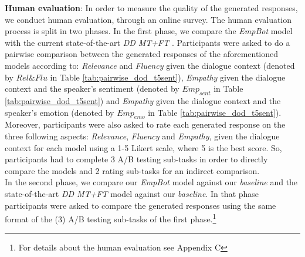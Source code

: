 \documentclass[11pt]{article}
\begin{document}
\noindent \textbf{Human evaluation}:
In order to measure the quality  of  the  generated  responses,  we  conduct human evaluation, through an online survey. The human evaluation process is split in two phases. In the first phase, we compare the \textit{EmpBot} model with the current state-of-the-art \textit{DD MT+FT} \citep{shuster_2019_dodeca_dialogues}. Participants were asked to do a pairwise comparison between the generated responses of the aforementioned models according to:
     \textit{Relevance} and \textit{Fluency}  given the dialogue context (denoted by $Rel\&Flu$ in Table \ref{tab:pairwise_dod_t5sent}),
     \textit{Empathy}  given the dialogue context and the speaker's sentiment (denoted by $Emp_{sent}$ in Table \ref{tab:pairwise_dod_t5sent}) and
     \textit{Empathy}  given the dialogue context and the speaker's emotion (denoted by $Emp_{emo}$ in Table \ref{tab:pairwise_dod_t5sent}).
Moreover, participants were also asked to rate each generated response  on the three following aspects: \textit{Relevance}, \textit{Fluency} and \textit{Empathy}, given the dialogue context for each model using a 1-5 Likert scale, where 5 is the best score. So, participants had to complete 3 A/B testing sub-tasks in order to directly compare the models and 2 rating sub-tasks for an indirect comparison. 
\\In the second phase, we compare our \textit{EmpBot} model against our \textit{baseline} and the state-of-the-art \textit{DD MT+FT} model against our \textit{baseline}. In that phase participants were asked to compare the generated responses using the same format of the (3) A/B testing sub-tasks of the first phase.\footnote{For details about the human evaluation  see Appendix C} 
\end{document}
